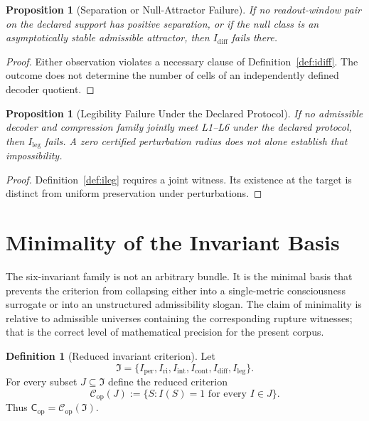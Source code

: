 \documentclass[11pt,a4paper]{article}
\newtheorem{proposition}[theorem]{Proposition}
\theoremstyle{definition}
\newtheorem{definition}[theorem]{Definition}
\newcommand{\Cop}{\mathsf{C}_{\mathrm{op}}}
\newcommand{\Iper}{I_{\mathrm{per}}}
\newcommand{\Iri}{I_{\mathrm{ri}}}
\newcommand{\Iint}{I_{\mathrm{int}}}
\newcommand{\Icont}{I_{\mathrm{cont}}}
\newcommand{\Idiff}{I_{\mathrm{diff}}}
\newcommand{\Ileg}{I_{\mathrm{leg}}}
\begin{document}
\begin{proposition}[Separation or Null-Attractor Failure]\label{prop:rupt-diff}
If no readout-window pair on the declared support has positive separation, or if the null class is an asymptotically stable admissible attractor, then $\Idiff$ fails there.
\end{proposition}

\begin{proof}
Either observation violates a necessary clause of Definition~\ref{def:idiff}. The outcome does not determine the number of cells of an independently defined decoder quotient.
\end{proof}

\begin{proposition}[Legibility Failure Under the Declared Protocol]\label{prop:rupt-leg}
If no admissible decoder and compression family jointly meet L1--L6 under the declared protocol, then $\Ileg$ fails. A zero certified perturbation radius does not alone establish that impossibility.
\end{proposition}

\begin{proof}
Definition~\ref{def:ileg} requires a joint witness. Its existence at the target is distinct from uniform preservation under perturbations.
\end{proof}


\section{Minimality of the Invariant Basis}
The six-invariant family is not an arbitrary bundle. It is the minimal basis that prevents the criterion from collapsing either into a single-metric consciousness surrogate or into an unstructured admissibility slogan. The claim of minimality is relative to admissible universes containing the corresponding rupture witnesses; that is the correct level of mathematical precision for the present corpus.

\begin{definition}[Reduced invariant criterion]\label{def:reduced}
Let
\[
\mathfrak{I}=\{\Iper,\allowbreak \Iri,\allowbreak \Iint,\allowbreak \Icont,\allowbreak \Idiff,\allowbreak \Ileg\}.
\]
For every subset $J \subseteq \mathfrak{I}$ define the reduced criterion
\[
\mathcal{C}_{\mathrm{op}}(J) := \{S : I(S)=1 \text{ for every } I \in J\}.
\]
Thus $\Cop = \mathcal{C}_{\mathrm{op}}(\mathfrak{I})$.
\end{definition}
\end{document}

